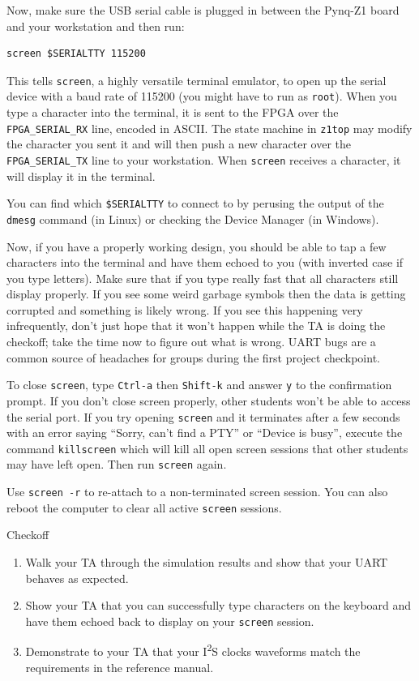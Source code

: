\documentclass[11pt]{article}
\makeatletter
\renewcommand{\subsection}
{\@startsection {subsection}{1}{0pt}
 {-1ex}
 {0.5ex}
 {\bfseries\normalsize}}
\makeatother
\begin{document}
Now, make sure the USB serial cable is plugged in between the Pynq-Z1 board and your workstation and then run:

\begin{verbatim}
screen $SERIALTTY 115200
\end{verbatim}

This tells \verb|screen|, a highly versatile terminal emulator, to open up the serial device with a baud rate of 115200 (you might have to run as \verb|root|). When you type a character into the terminal, it is sent to the FPGA over the \verb|FPGA_SERIAL_RX| line, encoded in ASCII. The state machine in \verb|z1top| may modify the character you sent it and will then push a new character over the \verb|FPGA_SERIAL_TX| line to your workstation. When \verb|screen| receives a character, it will display it in the terminal.

You can find which \verb|$SERIALTTY| to connect to by perusing the output of the \verb|dmesg| command (in Linux) or checking the Device Manager (in Windows).

Now, if you have a properly working design, you should be able to tap a few characters into the terminal and have them echoed to you (with inverted case if you type letters). Make sure that if you type really fast that all characters still display properly. If you see some weird garbage symbols then the data is getting corrupted and something is likely wrong. If you see this happening very infrequently, don't just hope that it won't happen while the TA is doing the checkoff; take the time now to figure out what is wrong. UART bugs are a common source of headaches for groups during the first project checkpoint.

To close \verb|screen|, type \verb|Ctrl-a| then \verb|Shift-k| and answer \verb|y| to the confirmation prompt. If you don't close screen properly, other students won't be able to access the serial port. If you try opening \verb|screen| and it terminates after a few seconds with an error saying ``Sorry, can't find a PTY'' or ``Device is busy'', execute the command \verb|killscreen| which will kill all open screen sessions that other students may have left open. Then run \verb|screen| again.

Use \verb|screen -r| to re-attach to a non-terminated screen session. You can also reboot the computer to clear all active \verb|screen| sessions.

\subsection{Checkoff}
\begin{enumerate}
    \item Walk your TA through the simulation results and show that your UART behaves as expected.
    \item Show your TA that you can successfully type characters on the keyboard and have them echoed back to display on your \verb|screen| session.
    \item Demonstrate to your TA that your I\textsuperscript{2}S clocks waveforms match the requirements in the reference manual.
\end{enumerate}
\end{document}
